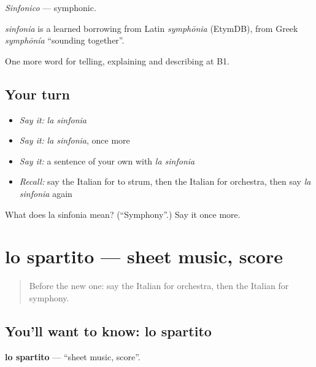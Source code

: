 \emph{Sinfonico} — symphonic.

\begin{cousinweb}
\emph{sinfonia} is a learned borrowing from Latin \emph{symphōnia} (EtymDB), from Greek \emph{symphōnía} \textquotedblleft{}sounding together\textquotedblright{}.
\end{cousinweb}

\begin{grammarlens}[title={What you've built}]
One more word for telling, explaining and describing at B1.
\end{grammarlens}

\subsection*{Your turn}
\begin{itemize}
\raggedright
  \item \emph{Say it:} \emph{la sinfonia}
  \item \emph{Say it:} \emph{la sinfonia}, once more
  \item \emph{Say it:} a sentence of your own with \emph{la sinfonia}
  \item \emph{Recall:} say the Italian for to strum, then the Italian for orchestra, then say \emph{la sinfonia} again
\end{itemize}

\begin{tcolorbox}[breakable,colback=teal!4,colframe=teal!35!black,title={Before you move on}]
What does la sinfonia mean? (\textquotedblleft{}Symphony\textquotedblright{}.) Say it once more.
\end{tcolorbox}
\section[lo spartito]{lo spartito — sheet music, score}

\label{lesson:IT-C517-spartito}



\begin{quote}
Before the new one: say the Italian for orchestra, then the Italian for symphony.
\end{quote}

\subsection*{You'll want to know: lo spartito}
\textbf{lo spartito} — \textquotedblleft{}sheet music, score\textquotedblright{}.

